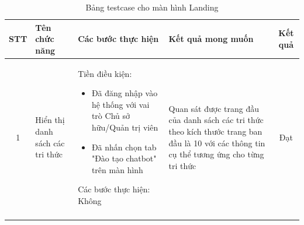 \begin{longtable}{|c|m{2.5cm}|m{5.5cm}|m{4.5cm}|c|}
    \hline
    \textbf{STT} & \textbf{Tên chức năng} & \textbf{Các bước thực hiện} & \textbf{Kết quả mong muốn} & \textbf{Kết quả} \\
    \hline
    1 & 
    Hiển thị danh sách các tri thức & 
    Tiền điều kiện:
    \begin{itemize}
        \item Đã đăng nhập vào hệ thống với vai trò Chủ sở hữu/Quản trị viên
        \item Đã nhấn chọn tab "Đào tạo chatbot" trên màn hình
    \end{itemize}
    Các bước thực hiện: Không
    & 
    Quan sát được trang đầu của danh sách các tri thức theo kích thước trang ban đầu là 10 với các thông tin cụ thể tương ứng cho  từng tri thức& Đạt \\
    \hline
    \caption{Bảng testcase cho màn hình Landing}
\end{longtable}